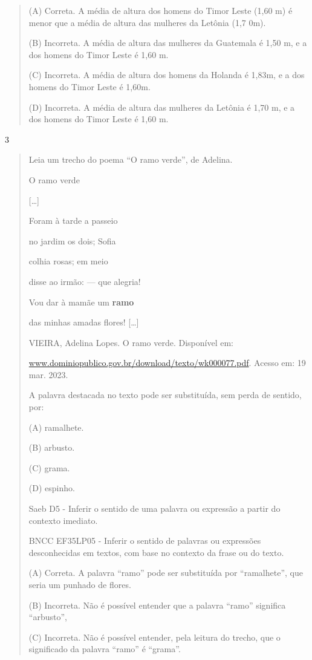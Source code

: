 \begin{escolha}
\begin{quote}
(A) Correta. A média de altura dos homens do Timor Leste (1,60 m) é
menor que a média de altura das mulheres da Letônia (1,7 0m).

(B) Incorreta. A média de altura das mulheres da Guatemala é 1,50 m, e a
dos homens do Timor Leste é 1,60 m.

(C) Incorreta. A média de altura dos homens da Holanda é 1,83m, e a dos
homens do Timor Leste é 1,60m.

(D) Incorreta. A média de altura das mulheres da Letônia é 1,70 m, e a
dos homens do Timor Leste é 1,60 m.
\end{quote}

\num{3}

\begin{quote}
Leia um trecho do poema ``O ramo verde'', de Adelina.

O ramo verde

{[}\ldots{}{]}

Foram à tarde a passeio

no jardim os dois; Sofia

colhia rosas; em meio

disse ao irmão: --- que alegria!

Vou dar à mamãe um \textbf{ramo}

das minhas amadas flores! {[}\ldots{}{]}

VIEIRA, Adelina Lopes. O ramo verde. Disponível em:

\href{http://www.dominiopublico.gov.br/download/texto/wk000077.pdf}{www.dominiopublico.gov.br/download/texto/wk000077.pdf}.
Acesso em: 19 mar. 2023.

A palavra destacada no texto pode ser substituída, sem perda de sentido,
por:

(A) ramalhete.

(B) arbusto.

(C) grama.

(D) espinho.

Saeb D5 - Inferir o sentido de uma palavra ou expressão a partir do
contexto imediato.

BNCC EF35LP05 - Inferir o sentido de palavras ou expressões
desconhecidas em textos, com base no contexto da frase ou do texto.

(A) Correta. A palavra ``ramo'' pode ser substituída por ``ramalhete'',
que seria um punhado de flores.

(B) Incorreta. Não é possível entender que a palavra ``ramo'' significa
``arbusto'',

(C) Incorreta. Não é possível entender, pela leitura do trecho, que o
significado da palavra ``ramo'' é ``grama''.


\end{quote}
\end{escolha}
